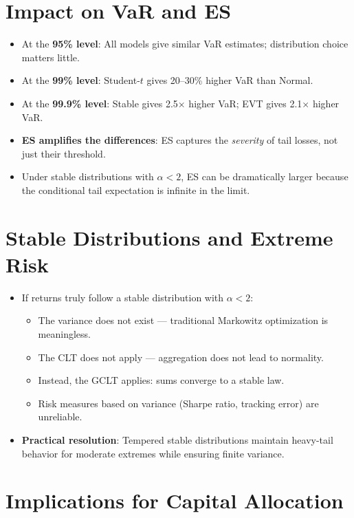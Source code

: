 \documentclass[11pt, a4paper]{article}
\theoremstyle{definition}
\begin{document}
\section{Impact on VaR and ES}

\begin{itemize}
  \item At the \textbf{95\% level}: All models give similar VaR estimates; distribution choice matters little.
  \item At the \textbf{99\% level}: Student-$t$ gives 20--30\% higher VaR than Normal.
  \item At the \textbf{99.9\% level}: Stable gives 2.5$\times$ higher VaR; EVT gives 2.1$\times$ higher VaR.
  \item \textbf{ES amplifies the differences}: ES captures the \textit{severity} of tail losses, not just their threshold.
  \item Under stable distributions with $\alpha < 2$, ES can be dramatically larger because the conditional tail expectation is infinite in the limit.
\end{itemize}

\section{Stable Distributions and Extreme Risk}

\begin{itemize}
  \item If returns truly follow a stable distribution with $\alpha < 2$:
  \begin{itemize}
    \item The variance does not exist — traditional Markowitz optimization is meaningless.
    \item The CLT does not apply — aggregation does not lead to normality.
    \item Instead, the GCLT applies: sums converge to a stable law.
    \item Risk measures based on variance (Sharpe ratio, tracking error) are unreliable.
  \end{itemize}
  \item \textbf{Practical resolution}: Tempered stable distributions maintain heavy-tail behavior for moderate extremes while ensuring finite variance.
\end{itemize}

\section{Implications for Capital Allocation}
\end{document}
